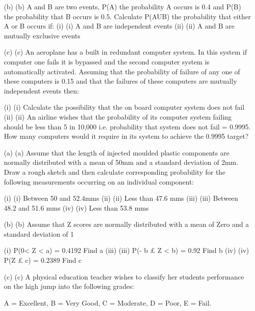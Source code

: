 (b)	(b)   A and B are two events, P(A)  the probability A occurs is 0.4 and P(B) the probability that B occurs is 0.5.  Calculate P(AUB) the probability that either A or B occurs if:
(i)	(i)                  A and B are independent events
(ii)	(ii)                A and B are mutually exclusive events


(c)	(c)    An aeroplane has a built in redundant computer system.  In this system if computer one fails it is bypassed and the second computer system is automatically activated.  Assuming that the probability of failure of any one of these computers is 0.15 and that the failures of these computers are mutually independent events then:
 
(i)	(i)                  Calculate the possibility that the on board computer system does not fail
(ii)	(ii)                An airline wishes that the probability of its computer system failing should be less than 5 in 10,000 i.e. probability that system does not fail = 0.9995.  How many computers would it require in its system to achieve the 0.9995 target?
 
 
 

(a)	(a)    Assume that the length of injected moulded plastic components are normally distributed with a mean of 50mm and a standard deviation of 2mm.  Draw a rough sketch and then calculate corresponding probability for the following measurements occurring on an individual component:
 
(i)	(i)                  Between 50 and 52.4mms
(ii)	(ii)                Less than 47.6 mms
(iii)	(iii)               Between 48.2 and 51.6 mms
(iv)	(iv)              Less than 53.8 mms

 
(b)	(b)   Assume that Z scores are normally distributed with a mean of Zero and a standard deviation of 1
 
(i) 	      P(0< Z < a) = 0.4192	Find a
(iii)	(iii)               P(- b £ Z < b) = 0.92	Find b
(iv)	(iv)              P(Z £ c) = 0.2389 		Find c
 
(c)	(c)    A physical education teacher wishes to classify her students performance on the high jump into the following grades:
 
A = Excellent, B = Very Good, C = Moderate, D = Poor, E = Fail.
 
